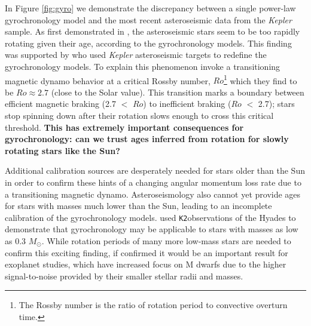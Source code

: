 \documentclass[12pt]{article}
\newcommand{\Kepler}{\textsl{Kepler}\xspace}
\newcommand{\ktwo}{{\tt K2}}
\begin{document}
In Figure \ref{fig:gyro} we demonstrate the discrepancy between a single
power-law gyrochronology model and the most recent asteroseismic data from
the \Kepler sample.
As first demonstrated in \citet{angus2015}, the asteroseismic stars seem to be
too rapidly rotating given their age, according to the gyrochronology models.
This finding was supported by \citet{van-saders2016} who used \Kepler
asteroseismic targets to redefine the gyrochronology models.
To explain this phenomenon \citet{van-saders2016} invoke a transitioning magnetic dynamo
behavior at a critical Rossby number, $Ro$\footnote{The Rossby number is the
ratio of rotation period to convective overturn time.} which they find to be
$Ro\approx2.7$ (close to the Solar value).
This transition marks a boundary between efficient magnetic braking (2.7 $<$
$Ro$) to inefficient braking ($Ro$ $<$ 2.7); stars stop spinning down after
their rotation slows enough to cross this critical threshold.
{\bf This has extremely important consequences for gyrochronology: can we trust
ages inferred from rotation for slowly rotating stars like the Sun?}

Additional calibration sources are desperately needed for stars older than the
Sun in order to confirm these hints of a changing angular momentum loss rate due to a transitioning magnetic dynamo.
Asteroseismology also cannot yet provide ages for stars with masses
much lower than the Sun, leading to an incomplete calibration of the gyrochronology models.
\citet{douglas2017} used \ktwo observations of the Hyades to demonstrate that
gyrochronology may be applicable to stars with masses as low as 0.3 $M_\odot$. While rotation periods of many more low-mass stars are needed to confirm this exciting finding, if confirmed it would be an important result for exoplanet studies,
which have increased focus on M dwarfs due to the higher signal-to-noise provided by
their smaller stellar radii and masses.


\end{document}
